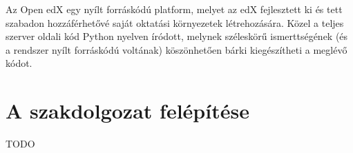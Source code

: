 Az Open edX egy nyílt forráskódú platform, melyet az edX fejlesztett ki és tett szabadon hozzáférhetővé saját oktatási környezetek létrehozására. Közel a teljes szerver oldali kód Python nyelven íródott, melynek széleskörű ismerttségének (és a rendszer nyílt forráskódú voltának) köszönhetően bárki kiegészítheti a meglévő kódot.

\section*{A szakdolgozat felépítése}
TODO